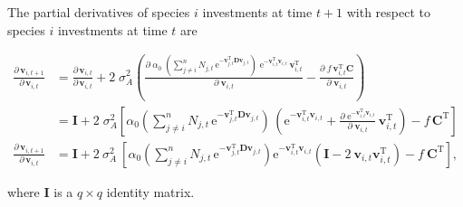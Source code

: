 The partial derivatives of species $i$ investments at time $t+1$ with respect
to species $i$ investments at time $t$ are

\begin{equation*}
\begin{split}
    \frac{ \partial \, \mathbf{v}_{i,t+1} }{ \partial \, \mathbf{v}_{i,t} } &=
        \frac{ \partial \, \mathbf{v}_{i,t} }{ \partial \, \mathbf{v}_{i,t} } +
        2 \; \sigma_A^2
        \left(
            \frac{ \partial \;
                \alpha_0 \; 
                \left( 
                    \sum_{j \ne i}^{n}{ N_{j,t} \, \textrm{e}^{
                    - \mathbf{v}_{j,t}^{\textrm{T}}
                    \mathbf{D} \mathbf{v}_{j,t} } }
                \right) \;
                    \textrm{e}^{-\mathbf{v}_{i,t}^{\textrm{T}} \mathbf{v}_{i,t}} \,
                    \mathbf{v}_{i,t}^{\textrm{T}}}{\partial \; \mathbf{v}_{i,t} } -
            \frac{ \partial \; f \, \mathbf{v}_{i,t}^{\textrm{T}} \mathbf{C}}{\partial \; \mathbf{v}_{i,t} }
        \right) \\
    &=
        \mathbf{I} +
        2 \; \sigma_A^2
        \left[
            \alpha_0
            \left( 
                \sum_{j \ne i}^{n}{ N_{j,t} \, \textrm{e}^{
                - \mathbf{v}_{j,t}^{\textrm{T}}
                \mathbf{D} \mathbf{v}_{j,t} } }
            \right) \,
            \left(
                \textrm{e}^{-\mathbf{v}_{i,t}^{\textrm{T}} \mathbf{v}_{i,t}} +
                \frac{ \partial \;
                        \textrm{e}^{-\mathbf{v}_{i,t}^{\textrm{T}} \mathbf{v}_{i,t}}
                        }{\partial \; \mathbf{v}_{i,t} } \, \mathbf{v}_{i,t}^{\textrm{T}}
            \right) -
            f \, \mathbf{C}^{\textrm{T}}
            \right] \\[2ex]
    \frac{ \partial \, \mathbf{v}_{i,t+1} }{ \partial \, \mathbf{v}_{i,t} } &= \mathbf{I} + 2 ~ \sigma_A^2 ~
        \left[
            \alpha_0 
            \left( 
                \sum_{j \ne i}^{n}{ N_{j,t} \, \textrm{e}^{
                - \mathbf{v}_{j,t}^{\textrm{T}}
                \mathbf{D} \mathbf{v}_{j,t} } }
            \right)
            \textrm{e}^{ - \mathbf{v}_{i,t}^{\textrm{T}} \mathbf{v}_{i,t} }
            \left(
                \mathbf{I} - 2 ~ \mathbf{v}_{i,t} \mathbf{v}_{i,t}^{\textrm{T}}
            \right) -
            f \: \mathbf{C}^{\textrm{T}}
        \right]
    \textrm{,}
\end{split}
\end{equation*}

\noindent where $\mathbf{I}$ is a $q \times q$ identity matrix.


